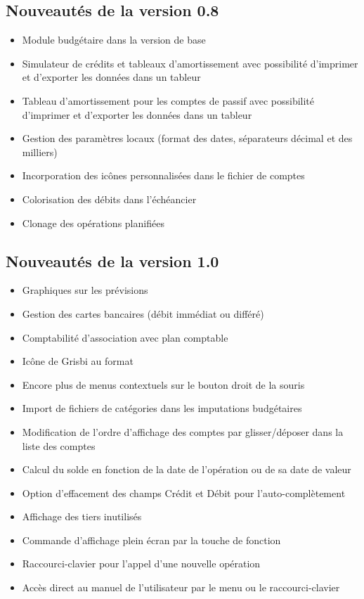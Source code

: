 \subsection{Nouveautés de la version 0.8}

\begin{itemize}
	\item Module budgétaire dans la version de base
	\item Simulateur de crédits et tableaux d'amortissement avec possibilité d'imprimer et d'exporter les données dans un tableur
	\item Tableau d'amortissement pour les comptes de passif avec possibilité d'imprimer et d'exporter les données dans un tableur
	\item Gestion des paramètres locaux (format des dates, séparateurs décimal et des milliers)
	\item Incorporation des icônes personnalisées dans le fichier de comptes
	\item Colorisation des débits dans l'échéancier
	\item Clonage des opérations planifiées
\end{itemize}

\newpage


\subsection{Nouveautés de la version 1.0}

\begin{itemize}
	\item Graphiques sur les prévisions
	\item Gestion des cartes bancaires (débit immédiat ou différé)
	\item Comptabilité d'association avec plan comptable
	\item Icône de Grisbi au format 
	\item Encore plus de menus contextuels sur le bouton droit de la souris
	\item Import de fichiers de catégories dans les imputations budgétaires
	\item Modification de l'ordre d'affichage des comptes par glisser/déposer dans la liste des comptes
	\item Calcul du solde en fonction de la date de l'opération ou de sa date de valeur
	\item Option d'effacement des champs Crédit et Débit pour l'auto-complètement
	\item Affichage des tiers inutilisés	
	\item Commande d'affichage plein écran par la touche de fonction 
	\item Raccourci-clavier  pour l'appel d'une nouvelle opération
	\item Accès direct au manuel de l'utilisateur par le menu  ou le raccourci-clavier 
\end{itemize}


